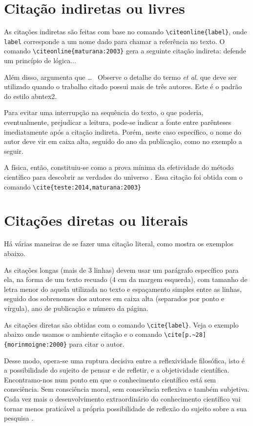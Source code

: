 \section{Citação indiretas ou livres}\label{ciação direta}

As citações indiretas são feitas com base no comando \verb|\citeonline{label}|, onde \verb|label| corresponde a um nome dado para chamar a referência no texto. O comando \verb|\citeonline{maturana:2003}| gera a seguinte citação indireta:  defende um princípio de lógica...

Além disso,  argumenta que \ldots\mbox{ } Observe o detalhe do termo \textit{et al}.
que deve ser utilizado quando o trabalho citado possui mais de três autores. Este é o padrão do estilo {\ttfamily abntex2}.

Para evitar uma interrupção na sequência do texto, o que poderia, eventualmente, prejudicar a leitura, pode-se indicar a fonte entre parênteses imediatamente após a citação indireta. Porém, neste caso específico, o nome do autor deve vir em caixa alta, seguido do ano da publicação, como no exemplo a seguir.

A física, então, constituiu-se como a prova mínima da efetividade do método científico para descobrir as verdades do universo \cite{teste:2014,maturana:2003}. Essa citação foi obtida com o comando \verb|\cite{teste:2014,maturana:2003}|


\section{Citações diretas ou literais}\label{citacoesdiretas}

Há várias maneiras de se fazer uma citação literal, como mostra os exemplos abaixo.

As citações longas (mais de 3 linhas) devem usar um parágrafo específico para ela, na forma de um texto recuado (4 cm da margem esquerda), com tamanho de letra menor do aquela utilizada no texto e espaçamento simples entre as linhas, seguido dos sobrenomes dos autores em caixa alta (separados por ponto e vírgula), ano de publicação e número da página.

As citações diretas são obtidas com o comando \verb|\cite{label}|. Veja o exemplo abaixo onde usamos o ambiente citação e o comando \verb|\cite[p.~28]{morinmoigne:2000}| para citar o autor.

\begin{citacao}
Desse modo, opera-se uma ruptura decisiva entre a reflexividade filosófica, isto 	é a possibilidade do sujeito de pensar e de refletir, e a objetividade científica.
Encontramo-nos num ponto em que o conhecimento científico está sem consciência.
Sem consciência moral, sem consciência reflexiva e também subjetiva.
Cada vez mais o desenvolvimento extraordinário do conhecimento científico vai tornar menos praticável a própria possibilidade de reflexão do sujeito sobre a sua pesquisa \cite[p.~28]{morinmoigne:2000}.
\end{citacao}

